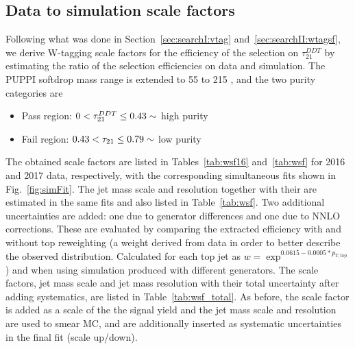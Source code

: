 \subsection{Data to simulation scale factors}
\label{sec:searchIII:wtagSF}
Following what was done in Section~\ref{sec:searchI:vtag} and~\ref{sec:searchII:wtagsf}, we derive W-tagging scale factors for the efficiency of the selection on $\tau_{21}^{DDT}$ by estimating the ratio of the selection efficiencies on data and simulation. The PUPPI softdrop mass range is extended to 55 to 215 \GeV, and the two purity categories are
\begin{itemize}
\itemsep0em
  \item Pass region: $0 <  \tau_{21}^{DDT} \leq 0.43 \sim$ high purity
  \item Fail region: $0.43 < \tau_{21} \leq 0.79 \sim$ low purity
\end{itemize}
The obtained scale factors are listed in Tables~\ref{tab:wsf16} and~\ref{tab:wsf} for 2016 and 2017 data, respectively, with the corresponding simultaneous fits shown in Fig.~\ref{fig:simFit}. 
The jet mass scale and resolution together with their are estimated in the same fits and also listed in Table~\ref{tab:wsf}. Two additional uncertainties are added: one due to generator differences and one due to NNLO corrections. These are evaluated by comparing the extracted efficiency with and without top \PT reweighting (a weight derived from data in order to better describe the observed \PT distribution. Calculated for each top jet as $w=\exp^{0.0615-0.0005*p_{T,top}}$) and when using \ttbar simulation produced with different generators. The scale factors, jet mass scale and jet mass resolution with their total uncertainty after adding systematics, are listed in Table~\ref{tab:wsf_total}. As before, the scale factor is added as a scale of the the signal yield and the jet mass scale and resolution are used to smear MC, and are additionally inserted as systematic uncertainties in the final fit (scale up/down).
